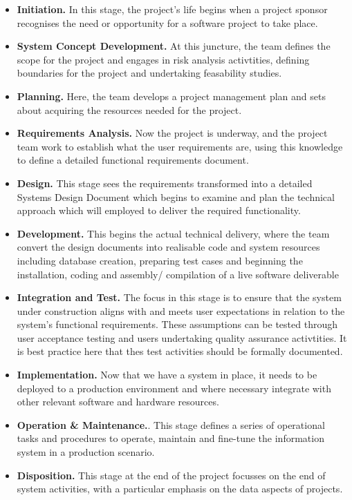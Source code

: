 \documentclass[a4paper,12pt]{article}
\begin{document}
\begin{samepage}
\begin{itemize}
\item  \textbf{Initiation.} In this stage, the project's life begins when a project sponsor recognises the need or opportunity for a software project to take place.
\item  \textbf {System Concept Development.} At this juncture, the team defines the scope for the project and engages in risk analysis activtities, defining boundaries for the project and undertaking feasability studies.
\item  \textbf{Planning.} Here, the team develops a project management plan and sets about acquiring the resources needed for the project.
\item  \textbf{Requirements Analysis.} Now the project is underway, and the project team work to establish what the user requirements are, using this knowledge to define a detailed functional requirements document.
\item  \textbf{Design.} This stage sees the requirements transformed into a detailed Systems Design Document which begins to examine and plan the technical approach which will employed to deliver the required functionality.
\item  \textbf{Development.} This begins the actual technical delivery, where the team convert the design documents into realisable code and system resources including database creation, preparing test cases and beginning the installation, coding and assembly/ compilation of a live software deliverable
\item  \textbf{Integration and Test.} The focus in this stage is to ensure that the system under construction aligns with and meets user expectations in relation to the system's functional requirements. These assumptions can be tested through user acceptance testing and users undertaking quality assurance activtities. It is best practice here that thes test activities should be formally documented. 
\newpage
\item  \textbf{Implementation.} Now that we have a system in place, it needs to be deployed to a production environment and where necessary integrate with other relevant software and hardware resources.
\item  \textbf{Operation \& Maintenance.}. This stage defines a series of operational tasks and procedures to operate, maintain and fine-tune the information system in a production scenario.
\item  \textbf{Disposition.} This stage at the end of the project focusses on the end of system activities, with a particular emphasis on the data aspects of projects.
\end{itemize}



\end{samepage}
\end{document}
